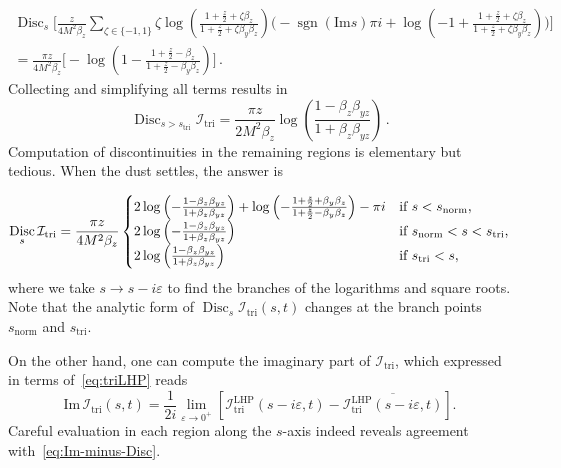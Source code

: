 \documentclass[12pt]{article}
\numberwithin{figure}{section}
\DeclareMathOperator{\sgn}{sgn}
\DeclareMathOperator{\Disc}{Disc}
\def \be {\begin{equation}}
\def \ee {\end{equation}}
\def \nn {\nonumber}
\def \I {\mathcal{I}}
\def \Im {\mathrm{Im}}
\def \triangle {\mathrm{tri}}
\def \normal {\mathrm{norm}}
\def \LHP {\mathrm{LHP}}
\begin{document}
    \begin{gather}
    \Disc_s \Bigg[\frac{z}{4 M^2 \beta_z} \sum_{\zeta \in \{-1,1\}}  \zeta
        \log \left( \tfrac{1+\frac{z}{2}+\zeta \beta_z}{1+\frac{z}{2}+\zeta \beta_y \beta_z} \right) \bigg(-\sgn(\Im s) \pi i + \log \left( -1 + \tfrac{1+ \frac{z}{2}+ \zeta \beta_z}{1+\frac{z}{2}+ \zeta \beta_y \beta_z} \right) \bigg)\Bigg]\nn
    \\ =
    \frac{\pi z}{4 M^2 \beta_z} 
    \Bigg[
    -\log(1-\tfrac{1+\frac{z}{2}-\beta_z}{1+\frac{z}{2}-\beta_y \beta_z})
    \Bigg] \,. 
    \end{gather}
    Collecting and simplifying all terms results in
    \be 
        \Disc_{s > s_{\triangle}} \I_{\triangle} = 
        \frac{\pi z}{2 M^2 \beta_z} \log \left( 
        \frac{1-\beta_z \beta_{yz}}{1+\beta_z \beta_{yz}} \right) \,.
    \ee 
    Computation of discontinuities in the remaining regions is elementary but tedious. When the dust settles, the answer is
    
    \begin{equation}
         \Disc_s \mathcal{I}_\triangle = 
         \frac{\pi z}{4 M^2 \beta_z} 
         \begin{cases}
             2 \log \left( - \frac{1-\beta_z \beta_{yz}}{1+\beta_z \beta_{yz}}\right) + \log \left(- \frac{1+\frac{z}{2}+\beta_y \beta_z}{1+\frac{z}{2} -\beta_y \beta_z} \right) - \pi i  \hfill &\text{if }  s < s_{\normal},
             \\
             2 \log \left( - \frac{1-\beta_z \beta_{yz}}{1+\beta_z \beta_{yz}}\right) \hfill &\text{if }s_{\normal} < s < s_{\triangle},
             \\
             2 \log \left( \frac{1-\beta_z \beta_{yz}}{1+\beta_z \beta_{yz}}\right) \hfill &\text{if } s_{\triangle} < s,
         \end{cases}
         \label{eq:Disc_cases}
    \end{equation}
    where we take $s\to s- i\varepsilon$ to find the branches of the logarithms and square roots. Note that the analytic form of $\Disc_s \mathcal{I}_\triangle(s,t)$ changes at the branch points $s_{\normal}$ and $s_\triangle$.
    
    On the other hand, one can compute the imaginary part of $\I_{\triangle}$, which expressed in terms of~\eqref{eq:triLHP} reads
    \be
    \Im\, \I_{\triangle}(s,t) = \frac{1}{2 i} \lim_{\varepsilon \to 0^+}  \left[ \mathcal{I}_\triangle^{\LHP}(s-i \varepsilon,t) - \overline{\mathcal{I}_\triangle^{\LHP}(s-i \varepsilon,t)} \right].
    \ee
    Careful evaluation in each region along the $s$-axis indeed reveals agreement with~\eqref{eq:Im-minus-Disc}.
    
\end{document}
